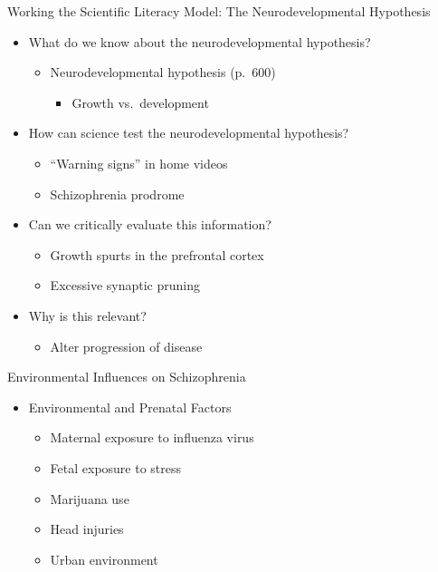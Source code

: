 \documentclass[
]{book}
\providecommand{\tightlist}{%
  \setlength{\itemsep}{0pt}\setlength{\parskip}{0pt}}
\begin{document}
\begin{reflect}
Working the Scientific Literacy Model: The Neurodevelopmental Hypothesis

\begin{itemize}
\tightlist
\item
  What do we know about the neurodevelopmental hypothesis?

  \begin{itemize}
  \tightlist
  \item
    Neurodevelopmental hypothesis (p.~600)

    \begin{itemize}
    \tightlist
    \item
      Growth vs.~development\\
    \end{itemize}
  \end{itemize}
\item
  How can science test the neurodevelopmental hypothesis?

  \begin{itemize}
  \tightlist
  \item
    ``Warning signs'' in home videos\\
  \item
    Schizophrenia prodrome\\
  \end{itemize}
\item
  Can we critically evaluate this information?

  \begin{itemize}
  \tightlist
  \item
    Growth spurts in the prefrontal cortex\\
  \item
    Excessive synaptic pruning\\
  \end{itemize}
\item
  Why is this relevant?

  \begin{itemize}
  \tightlist
  \item
    Alter progression of disease
  \end{itemize}
\end{itemize}

Environmental Influences on Schizophrenia

\begin{itemize}
\tightlist
\item
  Environmental and Prenatal Factors

  \begin{itemize}
  \tightlist
  \item
    Maternal exposure to influenza virus\\
  \item
    Fetal exposure to stress\\
  \item
    Marijuana use\\
  \item
    Head injuries\\
  \item
    Urban environment
  \end{itemize}
\end{itemize}


\end{reflect}
\end{document}
